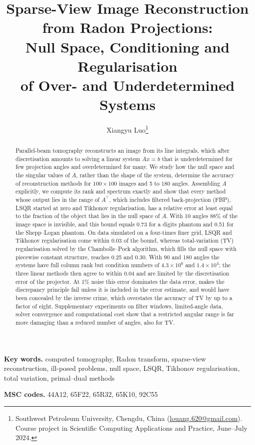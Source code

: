 \documentclass[11pt,a4paper]{article}
\title{Sparse-View Image Reconstruction from Radon Projections:\\ Null Space, Conditioning and Regularisation\\ of Over- and Underdetermined Systems}
\author{Xiangyu Luo\thanks{Southwest Petroleum University, Chengdu, China (\href{mailto:louang.620@gmail.com}{louang.620@gmail.com}). Course project in Scientific Computing Applications and Practice, June--July 2024.}}
\date{}
\numberwithin{equation}{section}
\theoremstyle{remark}
\begin{document}
\maketitle

\begin{abstract}
Parallel-beam tomography reconstructs an image from its line integrals, which after discretisation amounts to solving a linear system $Ax=b$ that is underdetermined for few projection angles and overdetermined for many. We study how the null space and the singular values of $A$, rather than the shape of the system, determine the accuracy of reconstruction methods for $100\times100$ images and 5 to 180 angles. Assembling $A$ explicitly, we compute its rank and spectrum exactly and show that every method whose output lies in the range of $A^\top$, which includes filtered back-projection (FBP), LSQR started at zero and Tikhonov regularisation, has a relative error at least equal to the fraction of the object that lies in the null space of $A$. With 10 angles 88\% of the image space is invisible, and this bound equals 0.73 for a digits phantom and 0.51 for the Shepp--Logan phantom. On data simulated on a four-times finer grid, LSQR and Tikhonov regularisation come within 0.03 of the bound, whereas total-variation (TV) regularisation solved by the Chambolle--Pock algorithm, which fills the null space with piecewise constant structure, reaches 0.25 and 0.30. With 90 and 180 angles the systems have full column rank but condition numbers of $4.3\times10^6$ and $1.4\times10^4$; the three linear methods then agree to within 0.04 and are limited by the discretisation error of the projector. At 1\% noise this error dominates the data error, makes the discrepancy principle fail unless it is included in the error estimate, and would have been concealed by the inverse crime, which overstates the accuracy of TV by up to a factor of eight. Supplementary experiments on filter windows, limited-angle data, solver convergence and computational cost show that a restricted angular range is far more damaging than a reduced number of angles, also for TV.
\end{abstract}

\noindent\textbf{Key words.} computed tomography, Radon transform, sparse-view reconstruction, ill-posed problems, null space, LSQR, Tikhonov regularisation, total variation, primal--dual methods

\smallskip
\noindent\textbf{MSC codes.} 44A12, 65F22, 65R32, 65K10, 92C55

\end{document}
